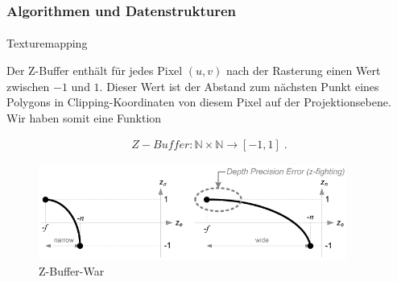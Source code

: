 \documentclass{beamer}
\begin{document}
\begin{frame}
    \frametitle{Algorithmen und Datenstrukturen}
\framesubtitle{}
    \begin{block}{Texturemapping}

Der Z-Buffer enthält für jedes Pixel $(u,v)$ nach der Rasterung  einen Wert zwischen $-1$ und $1$. Dieser Wert  ist der Abstand zum nächsten Punkt eines Polygons  in Clipping-Koordinaten von diesem Pixel auf der Projektionsebene.  Wir haben somit eine Funktion


\begin{align*}
Z-Buffer : \mathbb{N} \times \mathbb{N} \to [-1,1]  \; .
\end{align*}

\begin{figure}[H]
    \centering
    \includegraphics[width=0.9\textwidth]{images/gl_projectionmatrix_zbuffer_1.png}
    \caption{Z-Buffer-War}
    \label{fig:zbuffer-war}
\end{figure}

\end{block}

\end{frame}
\end{document}
